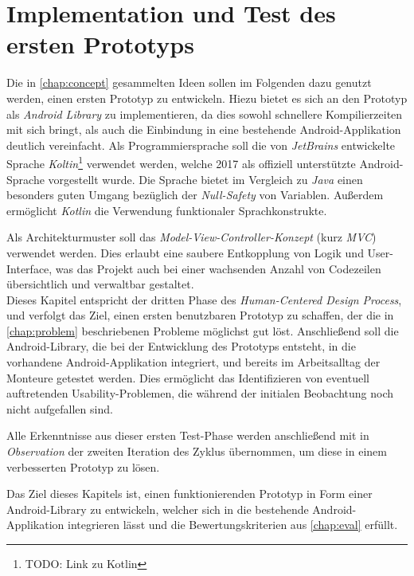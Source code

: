 \chapter{Implementation und Test des ersten Prototyps}

Die in \autoref{chap:concept} gesammelten Ideen sollen im Folgenden dazu genutzt werden, einen ersten Prototyp zu entwickeln.
Hiezu bietet es sich an den Prototyp als \emph{Android Library}  zu implementieren, da dies sowohl schnellere Kompilierzeiten mit sich bringt, als auch die Einbindung in eine bestehende Android-Applikation deutlich vereinfacht.
Als Programmiersprache soll die von \emph{JetBrains} entwickelte Sprache \emph{Koltin}\footnote{TODO: Link zu Kotlin} verwendet werden, welche 2017 als offiziell unterstützte Android-Sprache vorgestellt wurde.
Die Sprache bietet im Vergleich zu \emph{Java} einen besonders guten Umgang bezüglich der \emph{Null-Safety} von Variablen.
Außerdem ermöglicht \emph{Kotlin} die Verwendung funktionaler Sprachkonstrukte. \\

Als Architekturmuster soll das \emph{Model-View-Controller-Konzept} (kurz \emph{MVC}) verwendet werden. 
Dies erlaubt eine saubere Entkopplung von Logik und User-Interface, was das Projekt auch bei einer wachsenden Anzahl von Codezeilen übersichtlich und verwaltbar gestaltet. \\

Dieses Kapitel entspricht der dritten Phase des \emph{Human-Centered Design Process}, und verfolgt das Ziel, einen ersten benutzbaren Prototyp zu schaffen, der die in \autoref{chap:problem} beschriebenen Probleme möglichst gut löst. Anschließend soll die Android-Library, die bei der Entwicklung des Prototyps entsteht, in die vorhandene Android-Applikation integriert, und bereits im Arbeitsalltag der Monteure getestet werden.
Dies ermöglicht das Identifizieren von eventuell auftretenden Usability-Problemen, die während der initialen Beobachtung noch nicht aufgefallen sind.

Alle Erkenntnisse aus dieser ersten Test-Phase werden anschließend mit in \emph{Observation} der zweiten Iteration des \hcdp{} Zyklus übernommen, um diese in einem verbesserten Prototyp zu lösen.

Das Ziel dieses Kapitels ist, einen funktionierenden Prototyp in Form einer Android-Library zu entwickeln, welcher sich in die bestehende Android-Applikation integrieren lässt und die Bewertungskriterien aus \autoref{chap:eval} erfüllt.





